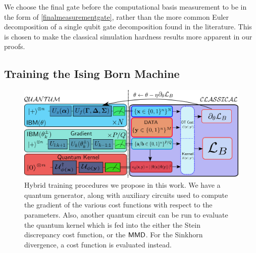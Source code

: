 \noindent We choose the final gate before the computational basis measurement to be in the form of \eqref{finalmeasurementgate}, rather than the more common Euler decomposition of a single qubit gate decomposition found in the literature\cite{liu_differentiable_2018, du_expressive_2018}. This is chosen to make the classical simulation hardness results more apparent in our proofs.

\subsection*{Training the Ising Born Machine}



\begin{figure}[ht]
\centering
            \includegraphics[width=\textwidth, height = 0.4\textwidth]{images/FIG_1a_pqc_npj.pdf}
            \caption{Hybrid training procedures we propose in this work. We have a quantum generator, along with auxiliary circuits used to compute the gradient of the various cost functions with respect to the parameters. Also, another quantum circuit can be run to evaluate the quantum kernel which is fed into the either the Stein discrepancy cost function, or the $\operatorname{\textsf{MMD}}$. For the Sinkhorn divergence, a cost function is evaluated instead.}\label{fig:ibmtraining}
\end{figure}

